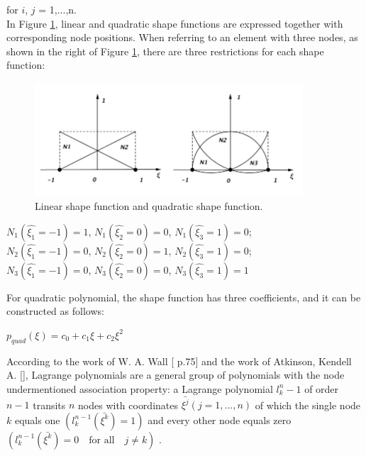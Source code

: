 for $i$, $j$ = 1,...,n. \\
In Figure \ref{fig: shape_func}, linear and quadratic shape functions are expressed together with corresponding node positions. When referring to an element with three nodes, as shown in the right of Figure \ref{fig: shape_func}, there are three restrictions for each shape function:

\begin{figure}
	\begin{center}
		\includegraphics[width=10cm,clip]{shape_func.pdf} 		
		\caption{Linear shape function and quadratic shape function.} \label{fig: shape_func}	
	\end{center}
\end{figure}

\begin{center}
	$N_1\left(\hat{\xi_1} = -1\right) = 1$, $N_1\left(\hat{\xi_2} = 0\right) = 0$, $N_1\left(\hat{\xi_3} = 1\right) = 0$;\\
	$N_2\left(\hat{\xi_1} = -1\right) = 0$, $N_2\left(\hat{\xi_2} = 0\right) = 1$, $N_2\left(\hat{\xi_3} = 1\right) = 0$;\\
	$N_3\left(\hat{\xi_1} = -1\right) = 0$, $N_3\left(\hat{\xi_2} = 0\right) = 0$, $N_3\left(\hat{\xi_3} = 1\right) = 1$
\end{center}
For quadratic polynomial, the shape function has three coefficients, and it can be constructed as follows:
\begin{center}
	$p_{quad}\left(\xi\right) = c_0 + c_1\xi + c_2\xi^2$
\end{center}
According to the work of W. A. Wall [\cite{FiniteElement} p.75] and the work of Atkinson, Kendell A. [\cite{Lagrange}], Lagrange polynomials are a general group of polynomials with the node undermentioned association property: a Lagrange polynomial $l_k^n-1$ of order $n-1$ transits $n$ nodes with coordinates $\bar{\xi^j}\left(j = 1,...,n\right)$ of which the single node $k$ equals one $\left(l_k^{n-1} \left(\bar{\xi^k}\right)=1\right)$ and every other node equals zero $\left(l_k^{n-1} \left(\bar{\xi^k}\right)=0  \quad \text{for all} \quad j \neq k\right)$ .

